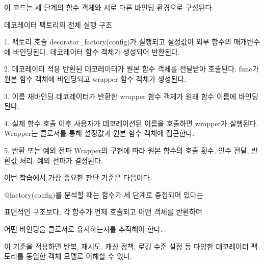 이 코드는 세 단계의 함수 객체와 서로 다른 바인딩 환경으로 구성된다.

\begin{dhksmry}
데코레이터 팩토리의 전체 실행 구조

1. 팩토리 호출
   decorator_factory(config)가 실행되고 설정값이 외부 함수의 
   매개변수에 바인딩된다. 데코레이터 함수 객체가 생성되어 반환된다.

2. 데코레이터 적용
   반환된 데코레이터가 원본 함수 객체를 전달받아 호출된다. func가 
   원본 함수 객체에 바인딩되고 wrapper 함수 객체가 생성된다.

3. 이름 재바인딩
   데코레이터가 반환한 wrapper 함수 객체가 원래 함수 이름에 바인딩된다.

4. 실제 함수 호출
   이후 사용자가 데코레이션된 이름을 호출하면 wrapper가 실행된다. 
   Wrapper는 클로저를 통해 설정값과 원본 함수 객체에 접근한다.

5. 반환 또는 예외 전파
   Wrapper의 구현에 따라 원본 함수의 호출 횟수, 인수 전달,
   반환값 처리, 예외 전파가 결정된다.
\end{dhksmry}

이번 학습에서 가장 중요한 판단 기준은 다음이다.

\begin{dhksmry}[centered]
@factory(config)를 분석할 때는 함수가 세 단계로 중첩되어 있다는

표면적인 구조보다, 각 함수가 언제 호출되고 어떤 객체를 반환하며

어떤 바인딩을 클로저로 유지하는지를 추적해야 한다.
\end{dhksmry}

이 기준을 적용하면 반복, 재시도, 캐싱 정책, 로깅 수준 설정 등 다양한 데코레이터 팩토리를 동일한 객체 모델로 이해할 수 있다.
